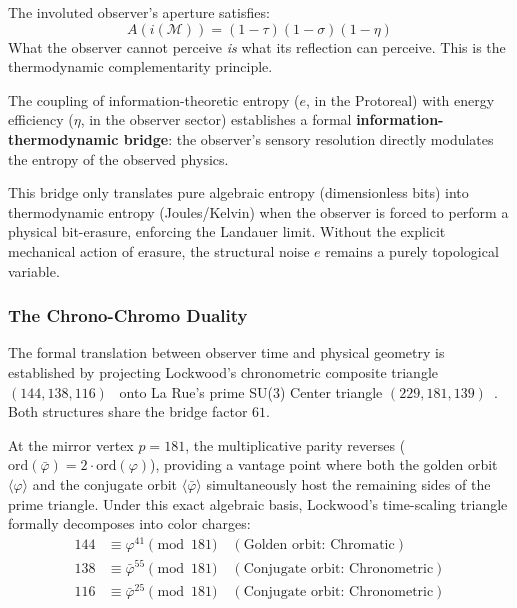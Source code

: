 \begin{theorem}
The involuted observer's aperture satisfies:
\begin{equation}
    A(i(\mathcal{M})) = (1 - \tau)(1 - \sigma)(1 - \eta)
\end{equation}
What the observer cannot perceive \emph{is} what its reflection can perceive. This is the thermodynamic complementarity principle.
\end{theorem}

The coupling of information-theoretic entropy ($e$, in the Protoreal) with energy efficiency ($\eta$, in the observer sector) establishes a formal \textbf{information-thermodynamic bridge}: the observer's sensory resolution directly modulates the entropy of the observed physics. 

\begin{theorem}
This bridge only translates pure algebraic entropy (dimensionless bits) into thermodynamic entropy (Joules/Kelvin) when the observer is forced to perform a physical bit-erasure, enforcing the Landauer limit. Without the explicit mechanical action of erasure, the structural noise $e$ remains a purely topological variable.
\end{theorem}

\subsubsection{The Chrono-Chromo Duality}

The formal translation between observer time and physical geometry is established by projecting Lockwood's chronometric composite triangle $(144, 138, 116)$~\cite{lockwood_chrono} onto La Rue's prime SU(3) Center triangle $(229, 181, 139)$~\cite{larue_chromatic}. Both structures share the bridge factor $61$. 

At the mirror vertex $p = 181$, the multiplicative parity reverses ($\mathrm{ord}(\bar{\varphi}) = 2 \cdot \mathrm{ord}(\varphi)$), providing a vantage point where both the golden orbit $\langle \varphi \rangle$ and the conjugate orbit $\langle \bar{\varphi} \rangle$ simultaneously host the remaining sides of the prime triangle. Under this exact algebraic basis, Lockwood's time-scaling triangle formally decomposes into color charges:
\begin{align*}
144 &\equiv \varphi^{41} \pmod{181} \quad (\text{Golden orbit: Chromatic}) \\
138 &\equiv \bar{\varphi}^{55} \pmod{181} \quad (\text{Conjugate orbit: Chronometric}) \\
116 &\equiv \bar{\varphi}^{25} \pmod{181} \quad (\text{Conjugate orbit: Chronometric})
\end{align*}

